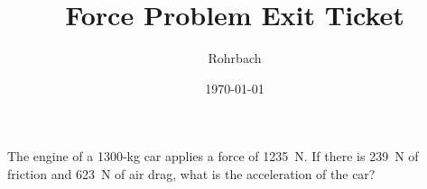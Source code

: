 \documentclass[10pt]{exam}
\title{Force Problem Exit Ticket}
\author{Rohrbach}
\date{\today}
\begin{document}
\maketitle

\noindent
The engine of a 1300-kg car applies a force of 1235~N.  If there is 239~N of friction and 623~N of air drag, what is the acceleration of the car?
\end{document}
